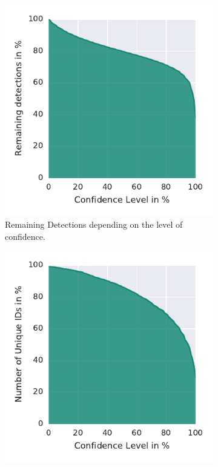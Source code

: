 \begin{figure}
    \centering
    \begin{subfigure}[b]{0.45\textwidth}
        \includegraphics[width=\textwidth]{Figures/confVSamount}
        \caption[Remaining Detections]{Remaining Detections depending on the level of confidence.}
        \label{fig:confVSamount}
    \end{subfigure}
    \begin{subfigure}[b]{0.45\textwidth}
        \includegraphics[width=\textwidth]{Figures/confVSids}

\end{subfigure}
\end{figure}
